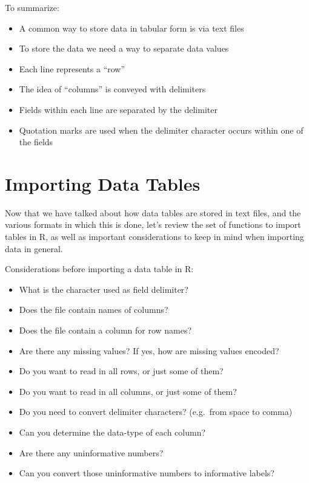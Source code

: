 \documentclass[
]{book}
\begin{document}
To summarize:

\begin{itemize}
\item
  A common way to store data in tabular form is via text files
\item
  To store the data we need a way to separate data values
\item
  Each line represents a ``row''
\item
  The idea of ``columns'' is conveyed with delimiters
\item
  Fields within each line are separated by the delimiter
\item
  Quotation marks are used when the delimiter character occurs within one of
  the fields
\end{itemize}

\hypertarget{importing-data-tables}{%
\section{Importing Data Tables}\label{importing-data-tables}}

Now that we have talked about how data tables are stored in text files, and
the various formats in which this is done, let's review the set of
functions to import tables in R, as well as important considerations to keep
in mind when importing data in general.

Considerations before importing a data table in R:

\begin{itemize}
\item
  What is the character used as field delimiter?
\item
  Does the file contain names of columns?
\item
  Does the file contain a column for row names?
\item
  Are there any missing values? If yes, how are missing values encoded?
\item
  Do you want to read in all rows, or just some of them?
\item
  Do you want to read in all columns, or just some of them?
\item
  Do you need to convert delimiter characters? (e.g.~from space to comma)
\item
  Can you determine the data-type of each column?
\item
  Are there any uninformative numbers?
\item
  Can you convert those uninformative numbers to informative labels?
\end{itemize}
\end{document}
